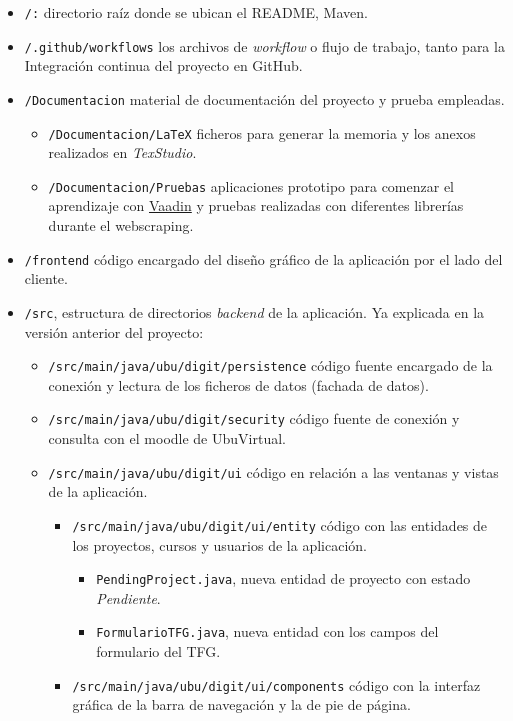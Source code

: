 \begin{itemize}
	\item \texttt{/:} directorio raíz donde se ubican el README, Maven. 
	\item \texttt{/.github/workflows} los archivos de \textit{workflow} o flujo de trabajo, tanto para la Integración continua del proyecto en GitHub.
	\item \texttt{/Documentacion} material de documentación del proyecto y prueba empleadas.
	\begin{itemize}
		\tightlist
		\item \texttt{/Documentacion/LaTeX} ficheros para generar la memoria y los anexos realizados en \emph{TexStudio}.
		\item \texttt{/Documentacion/Pruebas} aplicaciones prototipo para comenzar el aprendizaje con \href{https://vaadin.com/}{Vaadin} y pruebas realizadas con diferentes librerías durante el webscraping.
	\end{itemize}
	\item \texttt{/frontend} código encargado del diseño gráfico de la aplicación por el lado del cliente.
	\item \texttt{/src}, estructura de directorios \emph{backend} de la aplicación. Ya explicada en la versión anterior del proyecto:
		\begin{itemize}
			\item \texttt{/src/main/java/ubu/digit/persistence} código fuente encargado de la conexión y lectura de los ficheros de datos (fachada de datos).		
			\item \texttt{/src/main/java/ubu/digit/security} código fuente de conexión y consulta con el moodle de UbuVirtual.
			\item \texttt{/src/main/java/ubu/digit/ui} código en relación a las ventanas y vistas de la aplicación.
			\begin{itemize}
				\item \texttt{/src/main/java/ubu/digit/ui/entity} código con las entidades de los proyectos, cursos y usuarios de la aplicación.
					\begin{itemize}
						\item \texttt{PendingProject.java}, nueva entidad de proyecto con estado \emph{Pendiente}.
						\item \texttt{FormularioTFG.java}, nueva entidad con los campos del formulario del TFG.
					\end{itemize}
				\item \texttt{/src/main/java/ubu/digit/ui/components} código con la interfaz gráfica de la barra de navegación y la de pie de página.

\end{itemize}
\end{itemize}
\end{itemize}
